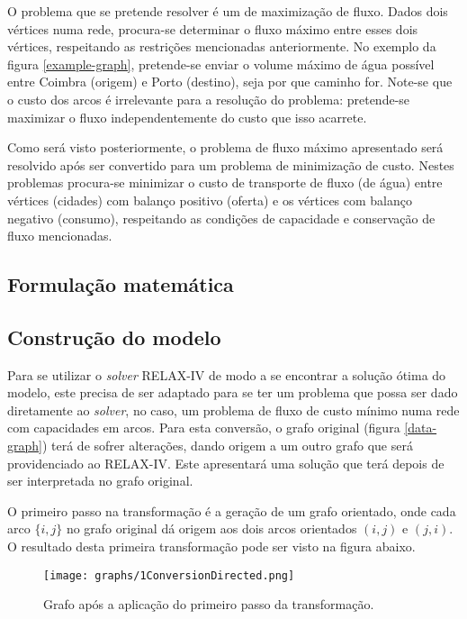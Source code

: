 \documentclass[12pt, a4paper, titlepage]{article}
\begin{document}

O problema que se pretende resolver é um de maximização de fluxo. Dados dois vértices numa rede,
procura-se determinar o fluxo máximo entre esses dois vértices, respeitando as restrições
mencionadas anteriormente. No exemplo da figura \ref{example-graph}, pretende-se enviar o volume
máximo de água possível entre Coimbra (origem) e Porto (destino), seja por que caminho for. Note-se
que o custo dos arcos é irrelevante para a resolução do problema: pretende-se maximizar o fluxo
independentemente do custo que isso acarrete.

Como será visto posteriormente, o problema de fluxo máximo apresentado será resolvido após ser
convertido para um problema de minimização de custo. Nestes problemas procura-se minimizar o custo
de transporte de fluxo (de água) entre vértices (cidades) com balanço positivo (oferta) e os
vértices com balanço negativo (consumo), respeitando as condições de capacidade e conservação de
fluxo mencionadas.

\subsection{Formulação matemática}


\subsection{Construção do modelo}

Para se utilizar o \emph{solver} RELAX-IV \cite{relax} de modo a se encontrar a solução ótima do
modelo, este precisa de ser adaptado para se ter um problema que possa ser dado diretamente ao
\emph{solver}, no caso, um problema de fluxo de custo mínimo numa rede com capacidades em arcos.
Para esta conversão, o grafo original (figura \ref{data-graph}) terá de sofrer alterações, dando
origem a um outro grafo que será providenciado ao RELAX-IV. Este apresentará uma solução que terá
depois de ser interpretada no grafo original.

O primeiro passo na transformação é a geração de um grafo orientado, onde cada arco $\{i, j\}$ no
grafo original dá origem aos dois arcos orientados $(i, j)$ e $(j, i)$. O resultado desta primeira
transformação pode ser visto na figura abaixo.

\begin{figure}[H]
    \centering
    \texttt{[image: graphs/1ConversionDirected.png]}
    \caption{Grafo após a aplicação do primeiro passo da transformação.}
    \label{1conversion-graph}
\end{figure}
\end{document}
